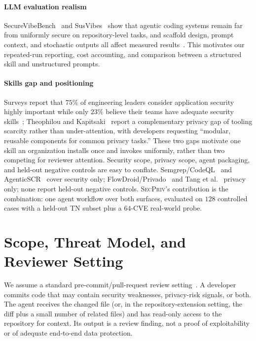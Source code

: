 \documentclass[runningheads]{llncs}
\begin{document}
\paragraph{LLM evaluation realism} SecureVibeBench~\cite{chen2025securevibebench} and SusVibes~\cite{zhao2025susvibes} show that agentic coding systems remain far from uniformly secure on repository-level tasks, and scaffold design, prompt context, and stochastic outputs all affect measured results~\cite{beljulji2025llmscr,ouyang2025empirical,yang2024sweagent}. This motivates our repeated-run reporting, cost accounting, and comparison between a structured skill and unstructured prompts.

\paragraph{Skills gap and positioning} Surveys report that $75\%$ of engineering leaders consider application security highly important while only $23\%$ believe their teams have adequate security skills~\cite{george2025skillsgap}; Theophilou and Kapitsaki~\cite{theophilou2026privacy_survey} report a complementary privacy gap of tooling scarcity rather than under-attention, with developers requesting ``modular, reusable components for common privacy tasks.'' These two gaps motivate one skill an organization installs once and invokes uniformly, rather than two competing for reviewer attention. Security scope, privacy scope, agent packaging, and held-out negative controls are easy to conflate. Semgrep/CodeQL~\cite{semgrep2023,codeql2024} and AgenticSCR~\cite{charoenwet2026agenticscr} cover security only; FlowDroid/Privado~\cite{arzt2014flowdroid,privado2024} and Tang et al.~\cite{tang2023privacydata} privacy only; none report held-out negative controls. \textsc{SecPriv}'s contribution is the combination: one agent workflow over both surfaces, evaluated on $128$ controlled cases with a held-out TN subset plus a $64$-CVE real-world probe.

\section{Scope, Threat Model, and Reviewer Setting}\label{sec:threat}

We assume a standard pre-commit/pull-request review setting~\cite{charoenwet2026agenticscr}. A developer commits code that may contain security weaknesses, privacy-risk signals, or both. The agent receives the changed file (or, in the repository-extension setting, the diff plus a small number of related files) and has read-only access to the repository for context. Its output is a review finding, not a proof of exploitability or of adequate end-to-end data protection.
\end{document}
